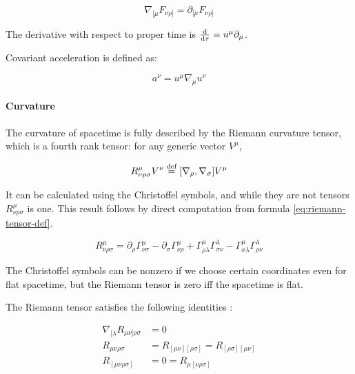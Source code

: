 \documentclass[main.tex]{subfiles}
\begin{document}
\begin{equation}
    \nabla_{[\mu} F_{\nu\rho]} = \partial_{[\mu} F_{\nu\rho]}
\end{equation}

The derivative with respect to proper time is $\dv{}{\tau} = u^\mu \partial_\mu$.

Covariant acceleration is defined as:

\begin{equation} \label{eq:covariant-acceleration-def}
    a^\nu = u^\mu \nabla_\mu u^\nu
\end{equation}

\paragraph{Curvature}

The curvature of spacetime is fully described by the Riemann curvature tensor, which is a fourth rank tensor: for any generic vector \(V^\mu\),

\begin{equation} \label{eq:riemann-tensor-def}
    R ^{\mu} _{\nu \rho \sigma} V^\nu \stackrel{\text{def}}{=} [\nabla_\rho, \nabla_\sigma]   V^\mu
\end{equation}

It can be calculated using the Christoffel symbols, and while they are not tensors \(R ^{\mu} _{\nu \rho \sigma}\) is one. This result follows by direct computation from formula \eqref{eq:riemann-tensor-def}.

\begin{equation}
    R ^{\mu} _{\nu \rho \sigma} =
     \partial_\rho \Gamma^\mu_{\nu \sigma}
    -\partial_\sigma \Gamma^\mu_{\nu \rho}
    +\Gamma^\mu_{\rho \lambda} \Gamma ^{\lambda} _{\sigma \nu}
    -\Gamma^\mu_{\sigma \lambda} \Gamma ^{\lambda} _{\rho \nu}
\end{equation}

The Christoffel symbols can be nonzero if we choose certain coordinates even for flat spacetime, but the Riemann tensor is zero iff the spacetime is flat.

The Riemann tensor satisfies the following identities \cite[eqs. 8.45 and 8.76]{Misner1973}:

\begin{subequations}
\begin{align}
  \nabla _{[\lambda} R_{\mu\nu]\rho \sigma} &= 0 \label{eq:bianchi-identities}  \\
  R_{\mu\nu\rho\sigma} &= R_{[\mu\nu][\rho\sigma]} = R_{[\rho\sigma][\mu\nu]}  \\
  R_{[\mu\nu\rho\sigma]} &= 0 = R_{\mu[\nu\rho\sigma]}
\end{align}
\end{subequations}
\end{document}
